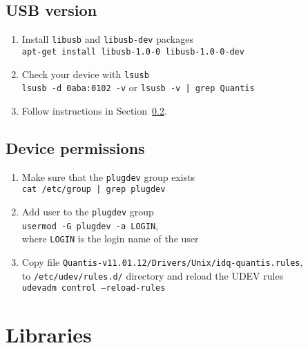 \documentclass[a4paper,11pt]{article}
\begin{document}
\subsection{USB version}
\begin{enumerate}
    \item Install \texttt{libusb} and \texttt{libusb-dev} packages\\ 
    \texttt{apt-get install libusb-1.0-0 libusb-1.0-0-dev}
    \item Check your device with \texttt{lsusb}\\
    \texttt{lsusb -d 0aba:0102 -v} or \texttt{lsusb -v | grep Quantis}
    \item Follow instructions in Section~\ref{sec:permissions}.
\end{enumerate}


\subsection{Device permissions}\label{sec:permissions}
\begin{enumerate}
    \item Make sure that the \texttt{plugdev} group exists\\
    \texttt{cat /etc/group | grep plugdev}
    \item Add user to the \texttt{plugdev} group\\
    \texttt{usermod -G plugdev -a LOGIN},\\ where \texttt{LOGIN} is the login name of the user
    \item Copy file \texttt{Quantis-v11.01.12/Drivers/Unix/idq-quantis.rules},\\ to \texttt{/etc/udev/rules.d/} directory and reload the UDEV rules\\
    \texttt{udevadm control --reload-rules}
\end{enumerate}

\section{Libraries}
\end{document}
